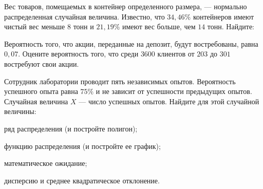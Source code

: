 \vfil

\begin{zkrPlain}{25}\noindent 
	Вес товаров, помещаемых в контейнер определенного размера, — нормально распределенная случайная величина. Известно, что $34{,}46\%$ контейнеров имеют чистый вес меньше $8$ тонн и $21{,}19\%$ имеют вес больше, чем $14$ тонн. Найдите: \par {}
 
\end{zkrPlain}

\vfil

\begin{zkrPlain}{25}\noindent 
	Вероятность того, что акции, переданные на депозит, будут востребованы, равна $ 0{,}07 $. Оцените вероятность того, что среди $ 3600 $ клиентов от $ 203 $ до $ 301 $ востребуют свои акции.
 
\end{zkrPlain}

\newpage\setcounter{zad}{0}\setcounter{footnote}{0}



\begin{zkrPlain}{25}\noindent 
	Сотрудник лаборатории проводит пять независимых опытов. Вероятность успешного опыта равна $75\%$ и не зависит от успешности предыдущих опытов. Случайная величина $X$ --- число успешных опытов.  Найдите для этой случайной величины: \par \smallskip\small{ \par \zz ряд распределения (и постройте полигон); \par \zz функцию распределения (и постройте ее график); \par \zz математическое ожидание; \par \zz дисперсию и среднее квадратическое отклонение.\par \par}
 
\end{zkrPlain}

\vfil

